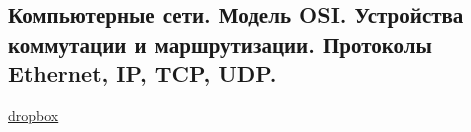 \subsection{Компьютерные сети. Модель OSI. Устройства коммутации и маршрутизации. Протоколы Ethernet, IP, TCP, UDP.}

\href{https://www.dropbox.com/sh/4st5b16mvdf8gkj/AAAI9sbKs_C3TFgRbqWGrAeca/Programming/16%20%D0%9A%D0%BE%D0%BC%D0%BF%D1%8C%D1%8E%D1%82%D0%B5%D1%80%D0%BD%D1%8B%D0%B5%20%D1%81%D0%B5%D1%82%D0%B8.pdf?dl=0}{dropbox}